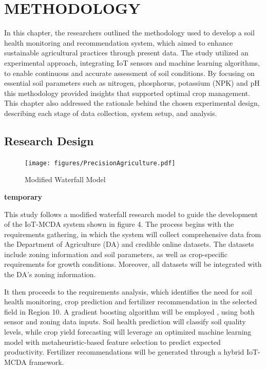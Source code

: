 \chapter{METHODOLOGY}
{\baselineskip
	
	In this chapter, the researchers outlined the methodology used to develop a soil health monitoring and recommendation system, which aimed to enhance sustainable agricultural practices through present data. The study utilized an experimental approach, integrating IoT sensors and machine learning algorithms, to enable continuous and accurate assessment of soil conditions. By focusing on essential soil parameters such as nitrogen, phosphorus, potassium (NPK) and pH this methodology provided insights that supported optimal crop management. This chapter also addressed the rationale behind the chosen experimental design, describing each stage of data collection, system setup, and analysis.
		
	\section{Research Design}
	\begin{figure}[H]
		\centering
		\caption{Modified Waterfall Model}
		\label{fig:ResearchDesign}
		\texttt{[image: figures/PrecisionAgriculture.pdf]}
	\end{figure}
	\textbf{temporary}
	
	This study follows a modified waterfall research model to guide the development of the IoT-MCDA system shown in figure 4. The process begins with the requirements gathering, in which the system will collect comprehensive data from the Department of Agriculture (DA) and credible online datasets. The datasets include zoning information and soil parameters, as well as crop-specific requirements for growth conditions. Moreover, all datasets will be integrated with the DA’s zoning information.
	 
	It then proceeds to the requirements analysis, which identifies the need for soil health monitoring, crop prediction and fertilizer recommendation in the selected field in Region 10. A gradient boosting algorithm will be employed , using both sensor and zoning data inputs. Soil health prediction will classify soil quality levels, while crop yield forecasting will leverage an optimized machine learning model with metaheuristic-based feature selection to predict expected productivity. Fertilizer recommendations will be generated through a hybrid IoT-MCDA framework. 
	
}
